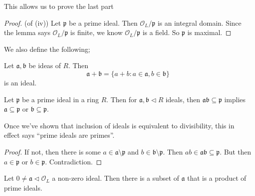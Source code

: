 \documentclass[a4paper]{article}
\begin{document}
This allows us to prove the last part
\begin{proof}(of (iv))
  Let $\mathfrak{p}$ be a prime ideal. Then $\mathcal{O}_L/\mathfrak{p}$ is an integral domain. Since the lemma says $\mathcal{O}_L/\mathfrak{p}$ is finite, we know $\mathcal{O}_L/\mathfrak{p}$ is a field. So $\mathfrak{p}$ is maximal.
\end{proof}

We also define the following;
\begin{defi}
  Let $\mathfrak{a}, \mathfrak{b}$ be ideas of $R$. Then
  \[
    \mathfrak{a} + \mathfrak{b} = \{a + b: a \in \mathfrak{a}, b \in \mathfrak{b}\}
  \]
  is an ideal.
\end{defi}

\begin{lemma}
  Let $\mathfrak{p}$ be a prime ideal in a ring $R$. Then for $\mathfrak{a}, \mathfrak{b}\lhd R$ ideals, then $\mathfrak{a}\mathfrak{b} \subseteq \mathfrak{p}$ implies $\mathfrak{a} \subseteq \mathfrak{p}$ or $\mathfrak{b}\subseteq \mathfrak{p}$.
\end{lemma}
Once we've shown that inclusion of ideals is equivalent to divisibility, this in effect says ``prime ideals are primes''.

\begin{proof}
  If not, then there is some $a \in \mathfrak{a}\setminus \mathfrak{p}$ and $b \in \mathfrak{b}\setminus \mathfrak{p}$. Then $ab \in \mathfrak{a}\mathfrak{b} \subseteq \mathfrak{p}$. But then $a \in \mathfrak{p}$ or $b \in \mathfrak{p}$. Contradiction.
\end{proof}

\begin{lemma}
  Let $0 \not= \mathfrak{a} \lhd \mathcal{O}_L$ a non-zero ideal. Then there is a subset of $\mathfrak{a}$ that is a product of prime ideals.
\end{lemma}
\end{document}
